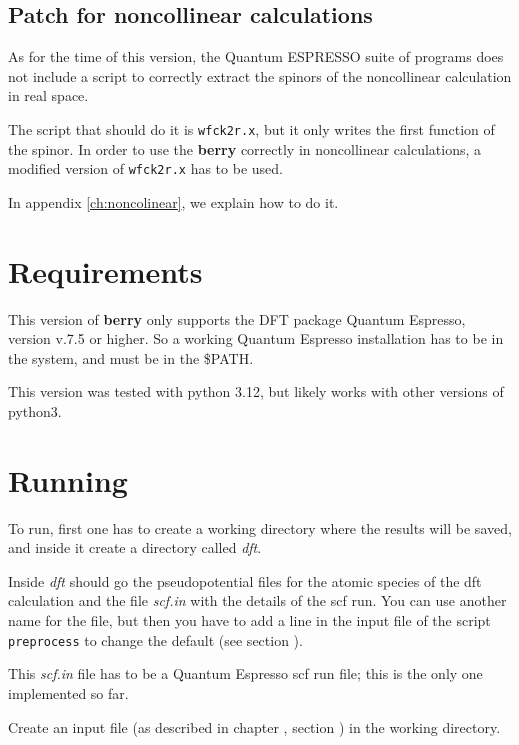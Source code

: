 \documentclass[a4paper,12pt]{report}
\begin{document}
\subsection{Patch for noncollinear calculations}

As for the time of this version, the {\sc Quantum ESPRESSO} suite of programs
does not include a script to correctly extract the spinors of the noncollinear calculation
in real space.

The script that should do it is \verb*|wfck2r.x|, but it only writes the first function of the spinor.
In order to use the \textbf{berry} correctly in noncollinear calculations,
a modified version of \verb*|wfck2r.x| has to be used.

In appendix \ref{ch:noncolinear}, we explain how to do it.



\section{Requirements}

This version of \textbf{berry} only supports the DFT package {\sc Quantum Espresso}, version v.7.5 or higher.
So a working {\sc Quantum Espresso} installation has to be in the system, and must be in the \$PATH.

This version was tested with python 3.12, but likely works with other versions of python3.


\section{Running}\label{sec:running}

 To run, first one has to create a working directory where the results will be saved,
 and inside it create a directory called \emph{dft}.

 Inside \emph{dft} should go the pseudopotential files for the atomic species of the dft calculation
and the file \emph{scf.in} with the details of the scf run.
You can use another name for the file, but then you have to add a line in the input file of
the script \texttt{preprocess} to change the default (see section ).


 This \emph{scf.in} file has to be a {\sc Quantum Espresso} scf run file;
 this is the only one implemented so far.

 Create an input file (as described in chapter , section )
 in the working directory.
\end{document}
